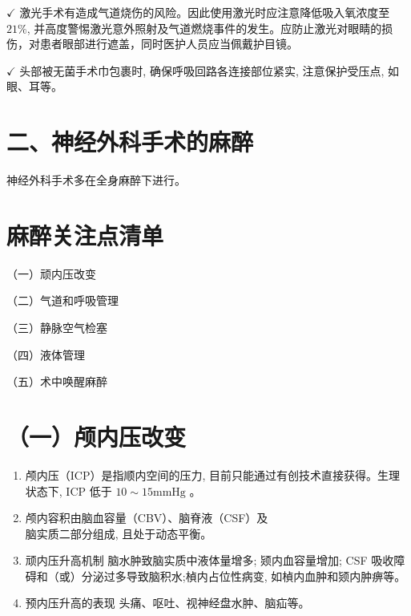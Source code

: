 \documentclass[10pt]{article}
\begin{document}
$\checkmark$ 激光手术有造成气道烧伤的风险。因此使用激光时应注意降低吸入氧浓度至 $21 \%$, 并高度警惕激光意外照射及气道燃烧事件的发生。应防止激光对眼睛的损伤，对患者眼部进行遮盖，同时医护人员应当佩戴护目镜。

$\checkmark$ 头部被无菌手术巾包裹时, 确保呼吸回路各连接部位紧实, 注意保护受压点, 如眼、耳等。

\section*{二、神经外科手术的麻醉}
神经外科手术多在全身麻醉下进行。

\section*{麻醉关注点清单}
（一）顽内压改变

（二）气道和呼吸管理

（三）静脉空气检塞

（四）液体管理

（五）术中唤醒麻醉

\section*{（一）颅内压改变}
\begin{enumerate}
  \item 颅内压（ICP）是指顺内空间的压力, 目前只能通过有创技术直接获得。生理状态下, ICP 低于 $10 \sim 15 \mathrm{mmHg}$ 。

  \item 颅内容积由脑血容量（CBV）、脑脊液（CSF）及\\
脑实质二部分组成, 且处于动态平衡。

  \item 顽内压升高机制 脑水肿致脑实质中液体量增多; 颎内血容量增加; CSF 吸收障碍和（或）分泌过多导致脑积水;楨内占位性病变, 如楨内血肿和颎内肿痹等。

  \item 预内压升高的表现 头痛、呕吐、视神经盘水肿、脑疝等。

\end{enumerate}
\end{document}
